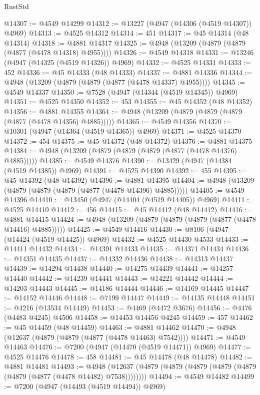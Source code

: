 \begin{lexlean}{RustStd}
\begin{coremodule}
{\begin{coremodule}
{{{{{{{{{{{{{{{{{{{{{{{{{{{{{{{{{{{{{{{{{{{{{{{{{{{{{{{{{{{{@14307 := @4549 @14299
@14312 := @13227 (@4947 (@14306 (@4519 @14307)) @4969)
@14313 := @4525 @14312
@14314 := 451
@14317 := @45 @14314 (@48 @14314)
@14318 := @4881 @14317
@14325 := @4948 (@13209 (@4879 (@4879 (@4877 (@4478 @14318) @4955))))
@14326 := @4549 @14318
@14331 := @13246 (@4947 (@14325 (@4519 @14326)) @4969)
@14332 := @4525 @14331
@14333 := 452
@14336 := @45 @14333 (@48 @14333)
@14337 := @4881 @14336
@14344 := @4948 (@13209 (@4879 (@4879 (@4877 (@4478 @14337) @4955))))
@14345 := @4549 @14337
@14350 := @7528 (@4947 (@14344 (@4519 @14345)) @4969)
@14351 := @4525 @14350
@14352 := 453
@14355 := @45 @14352 (@48 @14352)
@14356 := @4881 @14355
@14364 := @4948 (@13209 (@4879 (@4879 (@4879 (@4877 (@4478 @14356) @4885)))))
@14365 := @4549 @14356
@14370 := @10301 (@4947 (@14364 (@4519 @14365)) @4969)
@14371 := @4525 @14370
@14372 := 454
@14375 := @45 @14372 (@48 @14372)
@14376 := @4881 @14375
@14384 := @4948 (@13209 (@4879 (@4879 (@4879 (@4877 (@4478 @14376) @4885)))))
@14385 := @4549 @14376
@14390 := @13429 (@4947 (@14384 (@4519 @14385)) @4969)
@14391 := @4525 @14390
@14392 := 455
@14395 := @45 @14392 (@48 @14392)
@14396 := @4881 @14395
@14404 := @4948 (@13209 (@4879 (@4879 (@4879 (@4877 (@4478 @14396) @4885)))))
@14405 := @4549 @14396
@14410 := @13450 (@4947 (@14404 (@4519 @14405)) @4969)
@14411 := @4525 @14410
@14412 := 456
@14415 := @45 @14412 (@48 @14412)
@14416 := @4881 @14415
@14424 := @4948 (@13209 (@4879 (@4879 (@4879 (@4877 (@4478 @14416) @4885)))))
@14425 := @4549 @14416
@14430 := @8106 (@4947 (@14424 (@4519 @14425)) @4969)
@14432 := @4525 @14430 @4533
@14433 := @14411 @14432
@14434 := @14391 @14433
@14435 := @14371 @14434
@14436 := @14351 @14435
@14437 := @14332 @14436
@14438 := @14313 @14437
@14439 := @14294 @14438
@14440 := @14275 @14439
@14441 := @14257 @14440
@14442 := @14239 @14441
@14443 := @14221 @14442
@14444 := @14203 @14443
@14445 := @14186 @14444
@14446 := @14169 @14445
@14447 := @14152 @14446
@14448 := @7199 @14447
@14449 := @14135 @14448
@14451 := @4216 (@13534 @14449)
@14453 := @4469 (@4472 @3676)
@14456 := @4476 (@4483 @4245) @4506
@14458 := @14453 @14456 @4245
@14459 := 457
@14462 := @45 @14459 (@48 @14459)
@14463 := @4881 @14462
@14470 := @4948 (@12637 (@4879 (@4879 (@4877 (@4478 @14463) @7542))))
@14471 := @4549 @14463
@14476 := @7200 (@4947 (@14470 (@4519 @14471)) @4969)
@14477 := @4525 @14476
@14478 := 458
@14481 := @45 @14478 (@48 @14478)
@14482 := @4881 @14481
@14493 := @4948
    (@12637 (@4879 (@4879 (@4879 (@4879 (@4879 (@4879 (@4877 (@4478 @14482) @7538))))))))
@14494 := @4549 @14482
@14499 := @7200 (@4947 (@14493 (@4519 @14494)) @4969)
}}}}}}}}}}}}}}}}}}}}}}}}}}}}}}}}}}}}}}}}}}}}}}}}}}}}}}}}}}}}
\end{coremodule}}
\end{coremodule}
\end{lexlean}
